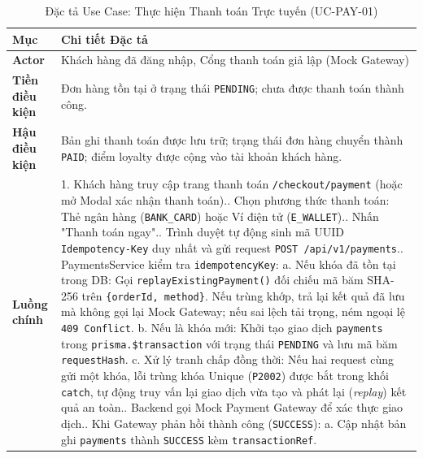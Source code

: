 \begin{table}[htbp]
\centering
\small
\caption{Đặc tả Use Case: Thực hiện Thanh toán Trực tuyến (UC-PAY-01)}
\label{tab:uc-spec-payment}
\begin{tabularx}{\textwidth}{p{2.8cm}X}
\toprule
\textbf{Mục} & \textbf{Chi tiết Đặc tả} \\
\midrule
\textbf{Actor} & Khách hàng đã đăng nhập, Cổng thanh toán giả lập (Mock Gateway) \\
\midrule
\textbf{Tiền điều kiện} & Đơn hàng tồn tại ở trạng thái \texttt{PENDING}; chưa được thanh toán thành công. \\
\midrule
\textbf{Hậu điều kiện} & Bản ghi thanh toán được lưu trữ; trạng thái đơn hàng chuyển thành \texttt{PAID}; điểm loyalty được cộng vào tài khoản khách hàng. \\
\midrule
\textbf{Luồng chính} & 
1. Khách hàng truy cập trang thanh toán \texttt{/checkout/payment} (hoặc mở Modal xác nhận thanh toán).\newline
2. Chọn phương thức thanh toán: Thẻ ngân hàng (\texttt{BANK\_CARD}) hoặc Ví điện tử (\texttt{E\_WALLET}).\newline
3. Nhấn "Thanh toán ngay".\newline
4. Trình duyệt tự động sinh mã UUID \texttt{Idempotency-Key} duy nhất và gửi request \texttt{POST /api/v1/payments}.\newline
5. PaymentsService kiểm tra \texttt{idempotencyKey}:\newline
\quad a. Nếu khóa đã tồn tại trong DB: Gọi \texttt{replayExistingPayment()} đối chiếu mã băm SHA-256 trên \texttt{\{orderId, method\}}. Nếu trùng khớp, trả lại kết quả đã lưu mà không gọi lại Mock Gateway; nếu sai lệch tải trọng, ném ngoại lệ \texttt{409 Conflict}.\newline
\quad b. Nếu là khóa mới: Khởi tạo giao dịch \texttt{payments} trong \texttt{prisma.\$transaction} với trạng thái \texttt{PENDING} và lưu mã băm \texttt{requestHash}.\newline
\quad c. Xử lý tranh chấp đồng thời: Nếu hai request cùng gửi một khóa, lỗi trùng khóa Unique (\texttt{P2002}) được bắt trong khối \texttt{catch}, tự động truy vấn lại giao dịch vừa tạo và phát lại (\textit{replay}) kết quả an toàn.\newline
6. Backend gọi Mock Payment Gateway để xác thực giao dịch.\newline
7. Khi Gateway phản hồi thành công (\texttt{SUCCESS}):\newline
\quad a. Cập nhật bản ghi \texttt{payments} thành \texttt{SUCCESS} kèm \texttt{transactionRef}.\newline

\end{tabularx}
\end{table}
